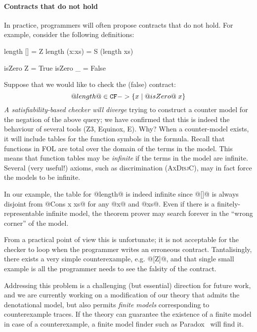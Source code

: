 \paragraph{Contracts that do not hold}
\label{ssect:countersat}

In practice, programmers will often propose contracts that do not hold. 
For example, consider the following definitions:
\begin{code}
  length []     = Z
  length (x:xs) = S (length xs)

  isZero Z = True
  isZero _ = False
\end{code}
Suppose that we would like to check the (false) contract:
   \[ @length@ \in {\tt CF} -> \{ x \mid @isZero@\;x\} \]
\emph{A satisfiability-based checker 
will diverge} trying to construct a counter model for the
negation of the above query; we have confirmed that this is indeed the
behaviour of several tools (Z3, Equinox, E).  Why?  When a
counter-model exists, it will include tables for the function symbols
in the formula. Recall that functions in FOL are total over the domain
of the terms in the model. This means that function tables may be {\em
infinite} if the terms in the model are infinite. Several (very
useful!)  axioms, such as discrimination (\textsc{AxDisjC}),
may in fact force the models to be infinite.

In our example, the table for @length@ is indeed infinite since @[]@ is
always disjoint from @Cons x xs@ for any @x@ and @xs@. Even if there
is a finitely-representable infinite model, the theorem prover may
search forever in the ``wrong corner'' of the model. 

From a practical point of view this is unfortunate; it is not
acceptable for the checker to loop when the programmer writes an
erroneous contract.  Tantalisingly, there exists a very simple
counterexample, e.g. @[Z]@, and that single small example is all the
programmer needs to see the falsity of the contract.

Addressing this problem is a challenging (but essential) 
direction for future work, and we are currently 
working on a modification of our theory that admits the denotational model, but 
also permits {\em finite models} corresponding to counterexample traces.
If the theory can guarantee the existence of a finite model in case of a counterexample,
a finite model finder such as Paradox~\cite{paradox} will find it.

